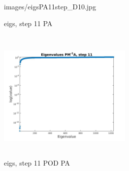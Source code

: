 \documentclass{beamer}
\begin{document}
\begin{frame}[shrink=10]
\begin{figure}[!h]
\begin{minipage}{.4\textwidth}
{images/eigsPA11step_D10.jpg}
\caption{eigs, step 11 PA}
\label{fig:NR_D10}
\end{minipage}%
\hspace{15mm}
\begin{minipage}{.4\textwidth}
 \centering
\includegraphics[width=6.5cm,height=6.5cm,keepaspectratio]
{images/eigsPA11step_POD5.jpg}
\caption{eigs, step 11 POD PA}
\label{fig:NR_POD5}
\end{minipage}
\end{figure}
\end{frame}
\end{document}
